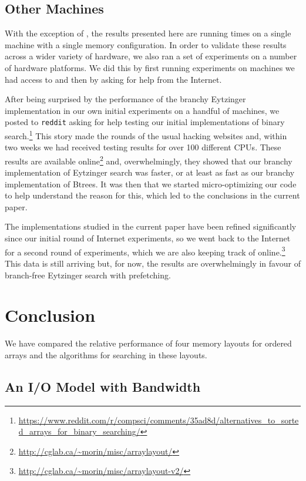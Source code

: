 \documentclass{patmorin}
\begin{document}
\subsection{Other Machines}

With the exception of , the results presented here are
running times on a single machine with a single memory configuration.
In order to validate these results across a wider variety of hardware,
we also ran a set of experiments on a number of hardware platforms. We
did this by first running experiments on machines we had access to and
then by asking for help from the Internet.

After being surprised by the performance of the branchy
Eytzinger implementation in our own initial experiments
on a handful of machines, we posted to \texttt{reddit}
asking for help testing our initial implementations of binary
search.\footnote{\url{https://www.reddit.com/r/compsci/comments/35ad8d/alternatives_to_sorted_arrays_for_binary_searching/}}
This story made the rounds of the usual hacking websites
and, within two weeks we had received testing results
for over 100 different CPUs.  These results are available
online\footnote{\url{http://cglab.ca/~morin/misc/arraylayout/}} and,
overwhelmingly, they showed that our branchy implementation of Eytzinger
search was faster, or at least as fast as our branchy implementation
of Btrees.  It was then that we started micro-optimizing our code to
help understand the reason for this, which led to the conclusions in
the current paper.

The implementations studied in the current paper have been
refined significantly since our initial round of Internet
experiments, so we went back to the Internet for a second
round of experiments, which we are also keeping track of
online.\footnote{\url{http://cglab.ca/~morin/misc/arraylayout-v2/}} This
data is still arriving but, for now, the results are overwhelmingly in
favour of branch-free Eytzinger search with prefetching.

\section{Conclusion}

We have compared the relative performance of four memory layouts for
ordered arrays and the algorithms for searching in these layouts.  

\subsection{An I/O Model with Bandwidth}
\end{document}
